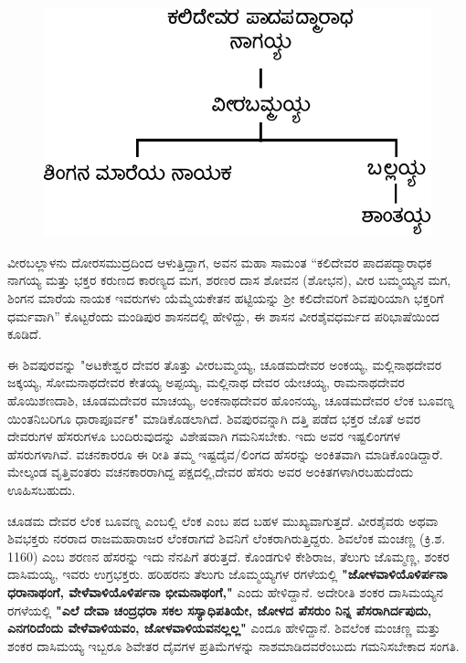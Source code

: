 \begin{figure}[H]
\includegraphics[scale=1.1]{images/chap4/chap4fig7.jpeg}
\end{figure}

\newpage

ವೀರಬಲ್ಲಾಳನು ದೋರಸಮುದ್ರದಿಂದ ಆಳುತ್ತಿದ್ದಾಗ, ಅವನ ಮಹಾ ಸಾಮಂತ “ಕಲಿದೇವರ ಪಾದಪದ್ಮಾರಾಧಕ ನಾಗಯ್ಯ ಮತ್ತು ಭಕ್ತರ ಕರುಣದ ಕಾರಣ್ಯದ ಮಗ, ಶರಣರ ದಾಸ ಶೋವನ (ಶೋಭನ), ವೀರ ಬಮ್ಮಯ್ಯನ ಮಗ, ಶಿಂಗನ ಮಾರೆಯ ನಾಯಕ ಇವರುಗಳು ಯೆಮ್ಮೆಯಕೇತನ ಹಟ್ಟಿಯನ್ನು ಶ‍್ರೀ ಕಲಿದೇವರಿಗೆ ಶಿವಪುರಿಯಾಗಿ ಭಕ್ತರಿಗೆ ಧರ್ಮವಾಗಿ” ಕೊಟ್ಟರೆಂದು ಮಂಡಿಪುರ ಶಾಸನದಲ್ಲಿ ಹೇಳಿದ್ದು, ಈ ಶಾಸನ ವೀರಶೈವಧರ್ಮದ ಪರಿಭಾಷೆಯಿಂದ ಕೂಡಿದೆ.

ಈ ಶಿವಪುರವನ್ನು "ಅಟಕೇಶ್ವರ ದೇವರ ತೊತ್ತು ವೀರಬಮ್ಮಯ್ಯ, ಚೂಡಮದೇವರ ಅಂಕಯ್ಯ, ಮಲ್ಲಿನಾಥದೇವರ ಜಕ್ಕಯ್ಯ, ಸೋಮನಾಥದೇವರ ಕೇತಯ್ಯ ಅಪ್ಪಯ್ಯ, ಮಲ್ಲಿನಾಥ ದೇವರ ಯೇಚಯ್ಯ, ರಾಮನಾಥದೇವರ ಹೊಯಿಶಣದಾಶಿ, ಚೂಡಮದೇವರ ಮಾಚಯ್ಯ, ಅಂಕನಾಥದೇವರ ಹೊಂನಯ್ಯ, ಚೂಡಮದೇವರ ಲೆಂಕ ಬೂವಣ್ನ ಯಿಂತನಿಬರಿಗೂ ಧಾರಾಪೂರ್ವಕ" ಮಾಡಿಕೊಡಲಾಗಿದೆ. ಶಿವಪುರವನ್ನಾಗಿ ದತ್ತಿ ಪಡೆದ ಭಕ್ತರ ಜೊತೆ ಅವರ ದೇವರುಗಳ ಹೆಸರುಗಳೂ ಬಂದಿರುವುದನ್ನು ವಿಶೇಷವಾಗಿ ಗಮನಿಸಬೇಕು. ಇದು ಅವರ ಇಷ್ಟಲಿಂಗಗಳ ಹೆಸರುಗಳಾಗಿವೆ. ವಚನಕಾರರೂ ಈ ರೀತಿ ತಮ್ಮ ಇಷ್ಟದೈವ/ಲಿಂಗದ ಹೆಸರನ್ನು ಅಂಕಿತವಾಗಿ ಮಾಡಿಕೊಂಡಿದ್ದಾರೆ. ಮೇಲ್ಕಂಡ ವೃತ್ತಿವಂತರು ವಚನಕಾರರಾಗಿದ್ದ ಪಕ್ಷದಲ್ಲಿ,\break ದೇವರ ಹೆಸರು ಅವರ ಅಂಕಿತಗಳಾಗಿರಬಹುದೆಂದು ಊಹಿಸಬಹುದು.

ಚೂಡಮ ದೇವರ ಲೆಂಕ ಬೂವಣ್ನ ಎಂಬಲ್ಲಿ ಲೆಂಕ ಎಂಬ ಪದ ಬಹಳ ಮುಖ್ಯವಾಗುತ್ತದೆ. ವೀರಶೈವರು ಅಥವಾ ಶಿವಭಕ್ತರು ನರರಾದ ರಾಜಮಹಾರಾಜರ ಲೆಂಕರಾಗದೆ ಶಿವನಿಗೆ ಲೆಂಕರಾಗಿರುತ್ತಿದ್ದರು. ಶಿವಲೆಂಕ ಮಂಚಣ್ಣ (ಕ್ರಿ.ಶ. 1160) ಎಂಬ ಶರಣನ ಹೆಸರನ್ನು ಇದು ನೆನಪಿಗೆ ತರುತ್ತದೆ. ಕೊಂಡಗುಳಿ ಕೇಶಿರಾಜ, ತೆಲುಗು ಜೊಮ್ಮಣ್ಣ, ಶಂಕರ ದಾಸಿಮಯ್ಯ, ಇವರು ಉಗ್ರಭಕ್ತರು. ಹರಿಹರನು ತೆಲುಗು ಜೊಮ್ಮಯ್ಯಗಳ ರಗಳೆಯಲ್ಲಿ \textbf{"ಜೋಳವಾಳಿಯೊಳಿರ್ಪನಾ ಧರಾನಾಥಂಗೆ, ವೇಳೆವಾಳಿಯೊಳಿರ್ಪನಾ ಭೀಮನಾಥಂಗೆ,"} ಎಂದು ಹೇಳಿದ್ದಾನೆ. ಅದೇರೀತಿ ಶಂಕರ ದಾಸಿಮಯ್ಯನ ರಗಳೆಯಲ್ಲಿ \textbf{"ಎಲೆ ದೇವಾ ಚಂದ್ರಧರಾ ಸಕಲ ಸಸ್ಯಾಧಿಪತಿಯೇ, ಜೋಳದ ಪೆಸರುಂ ನಿನ್ನ ಪೆಸರಾಗಿರ್ದಪುದು, ಎನಗರಿದೆಂದು ವೇಳೆವಾಳಿಯವಂ, ಜೋಳವಾಳಿಯವನಲ್ಲಲ್ಲ"} ಎಂದೂ ಹೇಳಿದ್ದಾನೆ. ಶಿವಲೆಂಕ ಮಂಚಣ್ಣ ಮತ್ತು ಶಂಕರ ದಾಸಿಮಯ್ಯ ಇಬ್ಬರೂ ಶಿವೇತರ ದೈವಗಳ ಪ್ರತಿಮೆಗಳನ್ನು ನಾಶಮಾಡಿದವರೆಂಬುದು ಗಮನಿಸಬೇಕಾದ ಸಂಗತಿ.

